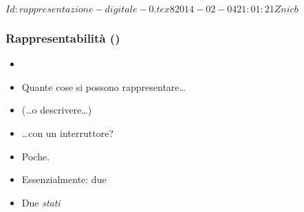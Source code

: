 %
%
%
%
%
\svnInfo $Id: rappresentazione-digitale-0.tex 8 2014-02-04 21:01:21Z nicb $

\setcounter{ms}{1}
\begin{frame}
  \frametitle{Rappresentabilit\`a ()}

	\begin{itemize}[<+- | alert@+->]

    \item[~]{~}
    \item{Quante cose si possono rappresentare\dots}

    \item{(\dots o descrivere\dots)}

    \item{\dots con un interruttore?}

    \item{Poche.}

    \item{Essenzialmente: due}

    \item{Due \emph{stati}}

	\end{itemize}

\end{frame}


